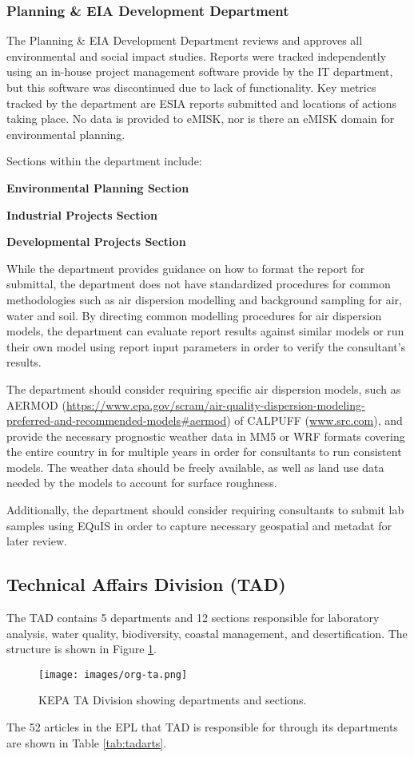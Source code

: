 \subsubsection{Planning \&  EIA Development Department}

The Planning \& EIA Development Department reviews and approves all environmental and social impact studies. Reports were tracked independently using an in-house project management software provide by the IT department, but this software was discontinued due to lack of functionality. Key metrics tracked by the department are ESIA reports submitted and locations of actions taking place. No data is provided to eMISK, nor is there an eMISK domain for environmental planning. 

Sections within the department include:

\textbf{ Environmental Planning Section}

\textbf{Industrial Projects Section}

\textbf{Developmental Projects Section}

While the department provides guidance on how to format the report for submittal, the  department does not have standardized procedures for common methodologies such as air dispersion modelling and background sampling for air, water and soil. By directing common modelling procedures for air dispersion models, the department can evaluate report results against similar models or run their own model using report input parameters in order to verify the consultant's results.  

The department should consider requiring specific air dispersion models, such as AERMOD (\url{https://www.epa.gov/scram/air-quality-dispersion-modeling-preferred-and-recommended-models#aermod}) of CALPUFF (\url{www.src.com}), and provide the necessary prognostic weather data in MM5 or WRF formats \citep{Henmi2004} covering the entire country in for multiple years in order for consultants to run consistent models. The weather data should be freely available, as well as land use data  needed by the models to account for surface roughness. 

Additionally, the department should consider requiring consultants to submit lab samples using EQuIS in order to capture necessary geospatial and metadat for later review.

\subsection{Technical Affairs Division (TAD)}
The TAD contains 5 departments and 12 sections  responsible for laboratory analysis, water quality, biodiversity, coastal management, and desertification.  The structure is shown in  Figure \ref{fig:taorg}.
%
\begin{figure}[H]
\centering
\texttt{[image: images/org-ta.png]} 
\caption{KEPA TA Division showing departments and sections.}
\label{fig:taorg}
\end{figure}
%
The 52 articles in the EPL that TAD is responsible for through its departments are shown in Table \ref{tab:tadarts}.

